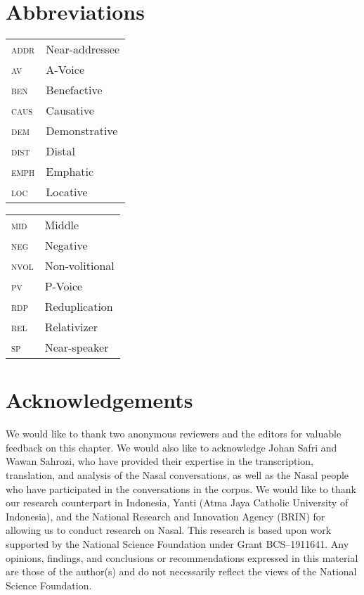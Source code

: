 \documentclass[output=paper,colorlinks,citecolor=brown
\ChapterDOI{10.5281/zenodo.15697585}
]{langscibook}
\begin{document}
\section*{Abbreviations}
\begin{tabularx}{.5\textwidth}[t]{@{}lQ@{}}
\textsc{addr} & Near-addressee\\
\textsc{av} & A-Voice \\
\textsc{ben} & Benefactive \\
\textsc{caus} & Causative \\
\textsc{dem} & Demonstrative\\
\textsc{dist} & Distal\\
\textsc{emph} & Emphatic \\
\textsc{loc} & Locative \\
\end{tabularx}%
\begin{tabularx}{.5\textwidth}[t]{@{}lQ@{}}
\textsc{mid} & Middle \\
\textsc{neg} & Negative \\
\textsc{nvol} & Non-volitional \\
\textsc{pv} & P-Voice \\
\textsc{rdp} & Reduplication \\
\textsc{rel} & Relativizer\\
\textsc{sp} & Near-speaker\\
\end{tabularx}

\section*{Acknowledgements}
We would like to thank two anonymous reviewers and the editors for valuable feedback on this chapter. We would also like to acknowledge Johan Safri and Wawan Sahrozi, who have provided their expertise in the transcription, translation, and analysis of the Nasal conversations, as well as the Nasal people who have participated in the conversations in the corpus. We would like to thank our research counterpart in Indonesia, Yanti (Atma Jaya Catholic University of Indonesia), and the National Research and Innovation Agency (BRIN) for allowing us to conduct research on Nasal. This research is based upon work supported by the National Science Foundation under Grant BCS–1911641. Any opinions, findings, and conclusions or recommendations expressed in this material are those of the author(s) and do not necessarily reflect the views of the National Science Foundation.

\printbibliography[heading=subbibliography,notkeyword=this]
\end{document}
